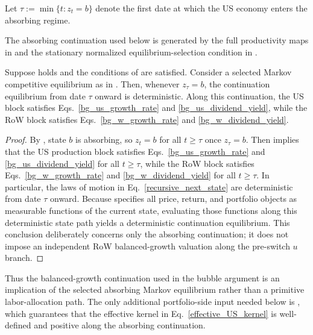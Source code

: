 \documentclass{article}
\begin{document}
Let $\tau:=\min\{t:z_t=b\}$ denote the first date at which the US economy enters the absorbing regime.

The absorbing continuation used below is generated by the full productivity maps in  and the stationary normalized equilibrium-selection condition in .

\begin{prop}\label{prop_absorbing_bg_primitives}
Suppose  holds and the conditions of  are satisfied. Consider a selected Markov competitive equilibrium as in . Then, whenever $z_\tau=b$, the continuation equilibrium from date $\tau$ onward is deterministic. Along this continuation, the US block satisfies Eqs.~\eqref{bg_us_growth_rate} and \eqref{bg_us_dividend_yield}, while the RoW block satisfies Eqs.~\eqref{bg_w_growth_rate} and \eqref{bg_w_dividend_yield}.
\end{prop}

\begin{proof}
By , state $b$ is absorbing, so $z_t=b$ for all $t\ge \tau$ once $z_\tau=b$. Then  implies that the US production block satisfies Eqs.~\eqref{bg_us_growth_rate} and \eqref{bg_us_dividend_yield} for all $t\ge \tau$, while the RoW block satisfies Eqs.~\eqref{bg_w_growth_rate} and \eqref{bg_w_dividend_yield} for all $t\ge \tau$. In particular, the laws of motion in Eq.~\eqref{recursive_next_state} are deterministic from date $\tau$ onward. Because  specifies all price, return, and portfolio objects as measurable functions of the current state, evaluating those functions along this deterministic state path yields a deterministic continuation equilibrium. This conclusion deliberately concerns only the absorbing continuation; it does not impose an independent RoW balanced-growth valuation along the pre-switch $u$ branch.
\end{proof}

Thus the balanced-growth continuation used in the bubble argument is an implication of the selected absorbing Markov equilibrium rather than a primitive labor-allocation path. The only additional portfolio-side input needed below is , which guarantees that the effective kernel in Eq.~\eqref{effective_US_kernel} is well-defined and positive along the absorbing continuation.
\end{document}

